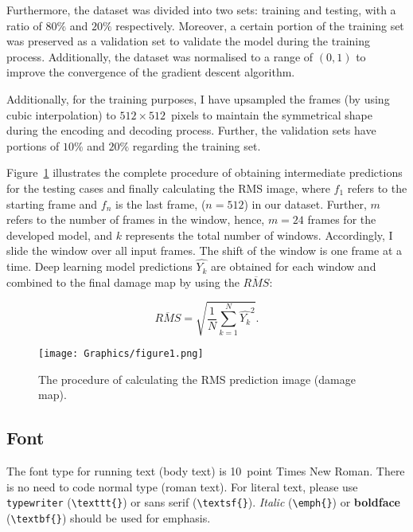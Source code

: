 \documentclass{IOS-Book-Article}
\begin{document}
Furthermore, the dataset was divided into two sets: training and testing, with a ratio of \(80\%\) and \(20\% \) respectively.
Moreover, a certain portion of the training set was preserved as a validation set to validate the model during the training process.
Additionally, the dataset was normalised to a range of \((0, 1)\) to improve the convergence of the gradient descent algorithm.

Additionally, for the training purposes, I have upsampled the frames (by using cubic interpolation) to \(512\times512\)~pixels to maintain the symmetrical shape during the encoding and decoding process.
Further, the validation sets have portions of \(10\%\) and \(20\%\) regarding the training set.

Figure~\ref{fig:Diagram_exp_predictions} illustrates the complete procedure of obtaining intermediate predictions for the testing cases and finally calculating the RMS image, where \(f_{1}\) refers to the starting frame and \(f_{n}\) is the last frame, (\(n=512\)) in our dataset.
Further, \(m\) refers to the number of frames in the window, hence, \(m=24\) frames for the developed model, and \(k\) represents the total number of windows.
Accordingly, I slide the window over all input frames.
The shift of the window is one frame at a time.
Deep learning model predictions \(\hat{Y_k}\) are obtained for each window and combined to the final damage map by using the $\overline{RMS}$:

\begin{equation}
	\overline{RMS} = \sqrt{\frac{1}{N}\sum_{k=1}^{N}\hat{Y_k}^2}.	
	\label{RMS}
\end{equation}
\begin{figure}[!h]
	\centering
	\texttt{[image: Graphics/figure1.png]}
	\caption{The procedure of calculating the RMS prediction image (damage map).}
	\label{fig:Diagram_exp_predictions}
\end{figure}


\subsection{Font}

The font type for running text (body text) is 10~point Times New Roman.
There is no need to code normal type (roman text). For literal text, please use
\texttt{type\-writer} (\verb|\texttt{}|)
or \textsf{sans serif} (\verb|\textsf{}|). \emph{Italic} (\verb|\emph{}|)
or \textbf{boldface} (\verb|\textbf{}|) should be used for emphasis.
\end{document}

